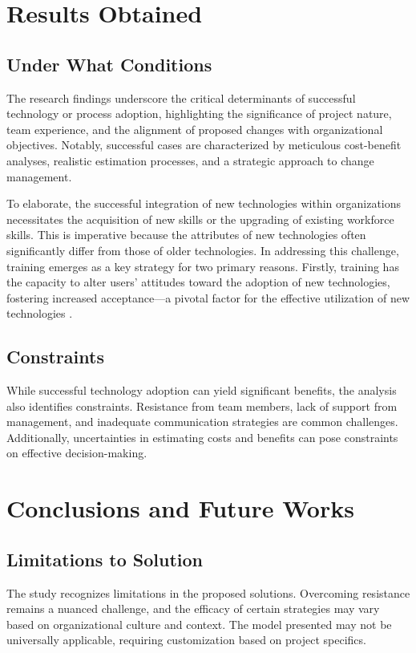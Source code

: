 \documentclass{article}
\begin{document}
\section{Results Obtained}
\subsection{Under What Conditions}
The research findings underscore the critical determinants of successful technology or process adoption, highlighting the significance of project nature, team experience, and the alignment of proposed changes with organizational objectives. Notably, successful cases are characterized by meticulous cost-benefit analyses, realistic estimation processes, and a strategic approach to change management. \newline

\noindent To elaborate, the successful integration of new technologies within organizations necessitates the acquisition of new skills or the upgrading of existing workforce skills. This is imperative because the attributes of new technologies often significantly differ from those of older technologies. In addressing this challenge, training emerges as a key strategy for two primary reasons. Firstly, training has the capacity to alter users' attitudes toward the adoption of new technologies, fostering increased acceptance—a pivotal factor for the effective utilization of new technologies \cite{reference10}.



\subsection{Constraints}
While successful technology adoption can yield significant benefits, the analysis also identifies constraints. Resistance from team members, lack of support from management, and inadequate communication strategies are common challenges. Additionally, uncertainties in estimating costs and benefits can pose constraints on effective decision-making.

\section{Conclusions and Future Works}
\subsection{Limitations to Solution}
The study recognizes limitations in the proposed solutions. Overcoming resistance remains a nuanced challenge, and the efficacy of certain strategies may vary based on organizational culture and context. The model presented may not be universally applicable, requiring customization based on project specifics.
\end{document}
